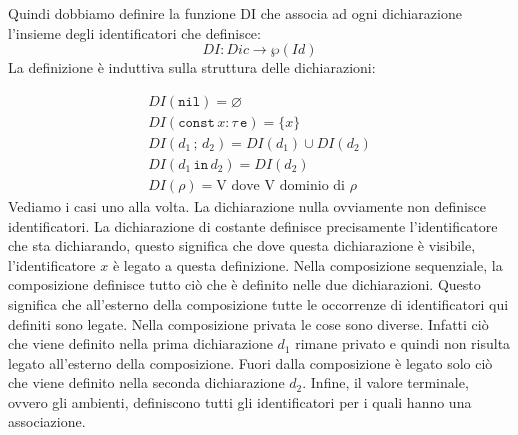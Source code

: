 \documentclass[oneside,a4paper,11pt]{book}
\theoremstyle{italicstyle}
\theoremstyle{normStyle}
\begin{document}
Quindi dobbiamo definire la funzione DI che associa ad ogni
dichiarazione l’insieme degli identificatori che definisce:
\[
  DI: Dic \rightarrow \wp(Id)
\]
La definizione è induttiva sulla struttura delle dichiarazioni:

\begin{align*}
  DI({\texttt{nil}})=\varnothing \\
  DI(\texttt{const} \,x: \tau \,\texttt{e}) = \{x\} \\
  DI(d_1\,;\,d_2)= DI(d_1) \cup DI(d_2) \\
  DI(d_1\,\texttt{in}\,d_2)= DI(d_2) \\
  DI(\rho) = \text{V dove V dominio di }\rho
\end{align*}
Vediamo i casi uno alla volta.
La dichiarazione nulla ovviamente non definisce identificatori.
La dichiarazione di costante definisce precisamente l’identificatore
che sta dichiarando, questo significa che dove questa dichiarazione è
visibile, l’identificatore $x$ è legato a questa definizione. Nella
composizione sequenziale, la composizione definisce tutto ciò che è
definito nelle due dichiarazioni. Questo significa che all’esterno
della composizione tutte le occorrenze di identificatori qui definiti
sono legate. Nella composizione privata le cose sono diverse. Infatti
ciò che viene definito nella prima dichiarazione $d_1$ rimane privato e
quindi non risulta legato all’esterno della composizione. Fuori dalla
composizione è legato solo ciò che viene definito nella seconda
dichiarazione $d_2$. Infine, il valore terminale, ovvero gli ambienti,
definiscono tutti gli identificatori per i quali hanno una associazione.
\end{document}
